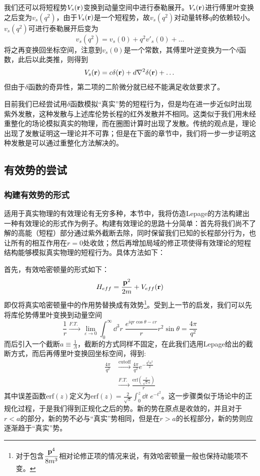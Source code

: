 \documentclass[cs4size,titlepage,twoside]{ctexart}
\begin{document}
我们还可以将短程势$V_s(\vb{r})$变换到动量空间中进行泰勒展开。$V_s(\vb{r})$进行傅里叶变换之后变为$v_s(q^2)$，由于$V_s(\vb{r})$是一个短程势，故$v_s(q^2)$对动量转移$q$的依赖较小。$v_s(q^2)$可进行泰勒展开后变为
\begin{equation}\label{qtaylor}
	v_s(q^2)=v_s(0)+q^2v'_s(0)+\dots
\end{equation}
将之再变换回坐标空间，注意到$v_s(0)$是一个常数，其傅里叶逆变换为一个$\delta$函数，此后以此类推，则得到
\begin{equation}\label{expand}
	V_s(\vb{r})=c\delta(\vb{r})+d\laplacian{\delta(\vb{r})}+\dots
\end{equation}
但由于$\delta$函数的奇异性，第二项的二阶微分就已经不能满足收敛要求了。

目前我们已经尝试用$\delta$函数模拟“真实”势的短程行为，但是均在进一步近似时出现紫外发散，这种发散与上述库伦势长程的红外发散并不相同。这类似于我们用未经重整化的场论模拟真实的物理，而在圈图计算时出现了发散。传统的观点是，理论出现了发散证明这一理论并不可靠；但是在下面的章节中，我们将一步一步证明这种发散是可以通过重整化方法解决的。
\subsection{有效势的尝试}
\subsubsection{构建有效势的形式}
适用于真实物理的有效理论有无穷多种，本节中，我将仿造Lepage的方法构建出一种有效理论的形式作为例子\cite{Lepage}\cite{Hill:2000yj}。构建有效理论的思路十分简单：首先将我们尚不了解的高能（短程）部分通过紫外截断去除，同时保留我们已知的长程部分行为，也让所有的相互作用在$r=0$处收敛；然后再增加局域的修正项使得有效理论的短程结构能够模拟真实物理的短程行为。具体方法如下：

首先，有效哈密顿量的形式如下：
\begin{equation}
	H_{eff}=\frac{\vb{p}^2}{2m}+V_{eff}(\vb{r})
\end{equation}
即仅将真实哈密顿量中的作用势替换成有效势\footnote{对于包含$\displaystyle\frac{\vb{p}^4}{8m^3}$相对论修正项的情况来说，有效哈密顿量一般也保持动能项不变。}。受到上一节的启发，我们可以先将库伦势傅里叶变换到动量空间
\begin{equation*}
	\frac{1}{r}\xrightarrow{F.T.\;\;}\lim_{\varepsilon\rightarrow0}\int_{0}^{\infty}\dd^3r\;\frac{e^{iqr\cos\theta-\varepsilon r}}{r}r^2\sin\theta=\frac{4\pi}{q^2}
\end{equation*}
而后引入一个截断$a\equiv\displaystyle\frac{1}{\Lambda}$，截断的方式同样不固定，在此我们选用Lepage给出的截断方式\cite{Lepage}，而后再傅里叶变换回坐标空间，得到:
\begin{align*}
	\frac{4\pi}{q^2} & \xrightarrow{\text{cutoff}}\frac{4\pi}{q^2}e^{-\frac{q^2a^2}{2}} \\
	                 & \xrightarrow{F.T.\;\;}\frac{\text{erf}(\frac{r}{\sqrt{2}a})}{r}
\end{align*}
其中误差函数$\text{erf}(z)$定义为$\displaystyle \text{erf} (z)=\frac{2}{\sqrt{\pi }}\int _0^z\dd t\;e^{-t^2}$。这一步骤类似于场论中的正规化过程，于是我们得到正规化之后的势。新的势在原点是收敛的，并且对于$r<a$的部分，新的势不必与“真实”势相同，但是在$r>a$的长程部分，新的势则应逐渐趋于“真实”势。
\end{document}
